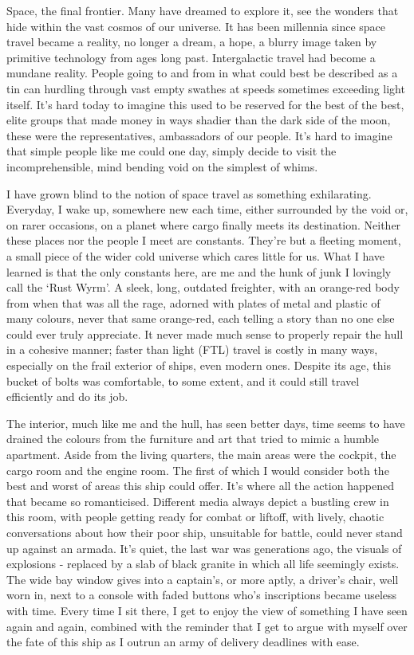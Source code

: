 Space, the final frontier. Many have dreamed to explore it, see the wonders that hide within the vast cosmos of our universe. It has been millennia since space travel became a reality, no longer a dream, a hope, a blurry image taken by primitive technology from ages long past. Intergalactic travel had become a mundane reality. People going to and from in what could best be described as a tin can hurdling through vast empty swathes at speeds sometimes exceeding light itself. It's hard today to imagine this used to be reserved for the best of the best, elite groups that made money in ways shadier than the dark side of the moon, these were the representatives, ambassadors of our people. It's hard to imagine that simple people like me could one day, simply decide to visit the incomprehensible, mind bending void on the simplest of whims.

I have grown blind to the notion of space travel as something exhilarating. Everyday, I wake up, somewhere new each time, either surrounded by the void or, on rarer occasions, on a planet where cargo finally meets its destination. Neither these places nor the people I meet are constants. They're but a fleeting moment, a small piece of the wider cold universe which cares little for us. What I have learned is that the only constants here, are me and the hunk of junk I lovingly call the `Rust Wyrm'. A sleek, long, outdated freighter, with an orange-red body from when that was all the rage, adorned with plates of metal and plastic of many colours, never that same orange-red, each telling a story than no one else could ever truly appreciate. It never made much sense to properly repair the hull in a cohesive manner; faster than light (FTL) travel is costly in many ways, especially on the frail exterior of ships, even modern ones. Despite its age, this bucket of bolts was comfortable, to some extent, and it could still travel efficiently and do its job. 

The interior, much like me and the hull, has seen better days, time seems to have drained the colours from the furniture and art that tried to mimic a humble apartment. Aside from the living quarters, the main areas were the cockpit, the cargo room and the engine room. The first of which I would consider both the best and worst of areas this ship could offer. It's where all the action happened that became so romanticised. Different media always depict a bustling crew in this room, with people getting ready for combat or liftoff, with lively, chaotic conversations about how their poor ship, unsuitable for battle, could never stand up against an armada. It's quiet, the last war was generations ago, the visuals of explosions - replaced by a slab of black granite in which all life seemingly exists. The wide bay window gives into a captain's, or more aptly, a driver's chair, well worn in, next to a console with faded buttons who's inscriptions became useless with time. Every time I sit there, I get to enjoy the view of something I have seen again and again, combined with the reminder that I get to argue with myself over the fate of this ship as I outrun an army of delivery deadlines with ease.

